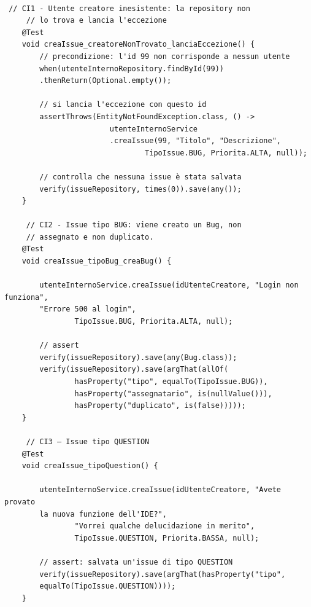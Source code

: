 \begin{listing}[!ht]
\begin{verbatim}

 // CI1 - Utente creatore inesistente: la repository non 
     // lo trova e lancia l'eccezione
    @Test
    void creaIssue_creatoreNonTrovato_lanciaEccezione() {
        // precondizione: l'id 99 non corrisponde a nessun utente
        when(utenteInternoRepository.findById(99))
        .thenReturn(Optional.empty());

        // si lancia l'eccezione con questo id
        assertThrows(EntityNotFoundException.class, () ->
                        utenteInternoService
                        .creaIssue(99, "Titolo", "Descrizione",
                                TipoIssue.BUG, Priorita.ALTA, null));

        // controlla che nessuna issue è stata salvata
        verify(issueRepository, times(0)).save(any());
    }

     // CI2 - Issue tipo BUG: viene creato un Bug, non 
     // assegnato e non duplicato.
    @Test
    void creaIssue_tipoBug_creaBug() {

        utenteInternoService.creaIssue(idUtenteCreatore, "Login non funziona", 
        "Errore 500 al login",
                TipoIssue.BUG, Priorita.ALTA, null);

        // assert
        verify(issueRepository).save(any(Bug.class));
        verify(issueRepository).save(argThat(allOf(
                hasProperty("tipo", equalTo(TipoIssue.BUG)),
                hasProperty("assegnatario", is(nullValue())),
                hasProperty("duplicato", is(false)))));
    }

     // CI3 — Issue tipo QUESTION
    @Test
    void creaIssue_tipoQuestion() {

        utenteInternoService.creaIssue(idUtenteCreatore, "Avete provato 
        la nuova funzione dell'IDE?",
                "Vorrei qualche delucidazione in merito",
                TipoIssue.QUESTION, Priorita.BASSA, null);

        // assert: salvata un'issue di tipo QUESTION
        verify(issueRepository).save(argThat(hasProperty("tipo", 
        equalTo(TipoIssue.QUESTION))));
    }

\end{verbatim}
\end{listing}

\clearpage

